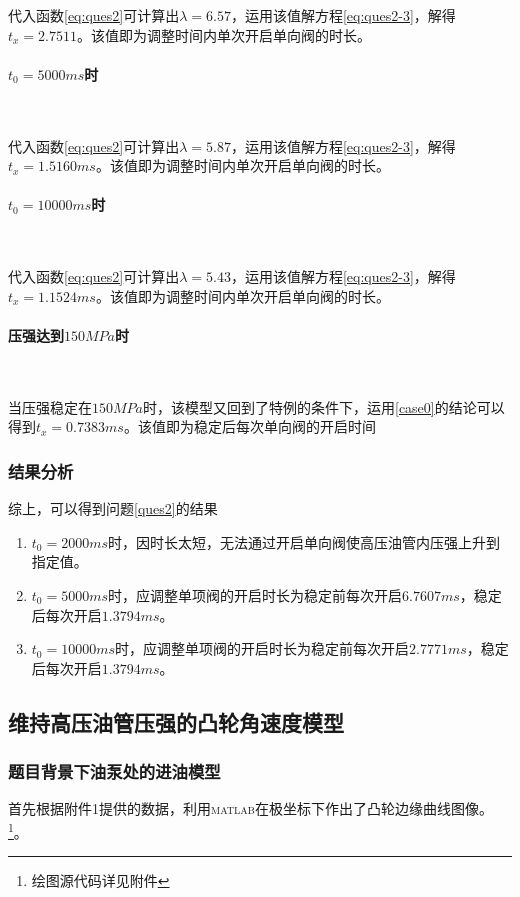 \documentclass{cumcmthesis}
\begin{document}
代入函数\cref{eq:ques2}可计算出$\lambda=6.57$，运用该值解方程\cref{eq:ques2-3}，解得$t_{x} =2.7511$。该值即为调整时间内单次开启单向阀的时长。

\paragraph{$t_{0}=5000ms$时}~{}

代入函数\cref{eq:ques2}可计算出$\lambda=5.87$，运用该值解方程\cref{eq:ques2-3}，解得$t_{x} = 1.5160ms$。该值即为调整时间内单次开启单向阀的时长。
\paragraph{$t_{0}=10000ms$时}~{}

代入函数\cref{eq:ques2}可计算出$\lambda=5.43$，运用该值解方程\cref{eq:ques2-3}，解得$t_{x} = 1.1524ms$。该值即为调整时间内单次开启单向阀的时长。

\paragraph{压强达到$150MPa$时}~{}

当压强稳定在$150MPa$时，该模型又回到了特例的条件下，运用\ref{case0}的结论可以得到$t_{x} = 0.7383ms$。该值即为稳定后每次单向阀的开启时间

\subsubsection{结果分析}

综上，可以得到问题\ref{ques2}的结果
\begin{enumerate}
	\item $t_{0}=2000ms$时，因时长太短，无法通过开启单向阀使高压油管内压强上升到指定值。
	\item $t_{0}=5000ms$时，应调整单项阀的开启时长为稳定前每次开启$6.7607ms$，稳定后每次开启$1.3794ms$。
	\item$t_{0}=10000ms$时，应调整单项阀的开启时长为稳定前每次开启$2.7771ms$，稳定后每次开启$1.3794ms$。
\end{enumerate}
\subsection{维持高压油管压强的凸轮角速度模型}

\subsubsection{题目背景下油泵处的进油模型}\label{case2}
首先根据附件1提供的数据，利用\textsc{matlab}在极坐标下作出了凸轮边缘曲线图像。\footnote{绘图源代码详见附件}。
\end{document}
